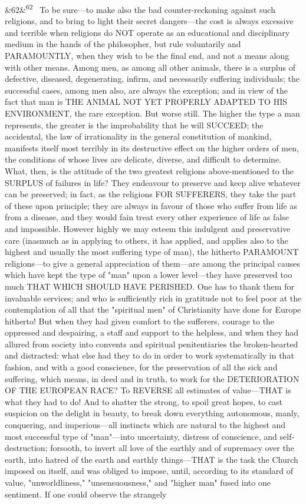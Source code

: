 \documentclass[12pt]{article}
\newcommand{\para}[1][]{\par\noindent\ifx&#1&\else\textsuperscript{\footnotesize #1}~\fi}
\begin{document}
\para[62] To be sure---to make also the bad counter-reckoning against such religions, and to bring to light their secret dangers---the cost is always excessive and terrible when religions do NOT operate as an educational and disciplinary medium in the hands of the philosopher, but rule voluntarily and PARAMOUNTLY, when they wish to be the final end, and not a means along with other means. Among men, as among all other animals, there is a surplus of defective, diseased, degenerating, infirm, and necessarily suffering individuals; the successful cases, among men also, are always the exception; and in view of the fact that man is THE ANIMAL NOT YET PROPERLY ADAPTED TO HIS ENVIRONMENT, the rare exception. But worse still. The higher the type a man represents, the greater is the improbability that he will SUCCEED; the accidental, the law of irrationality in the general constitution of mankind, manifests itself most terribly in its destructive effect on the higher orders of men, the conditions of whose lives are delicate, diverse, and difficult to determine. What, then, is the attitude of the two greatest religions above-mentioned to the SURPLUS of failures in life? They endeavour to preserve and keep alive whatever can be preserved; in fact, as the religions FOR SUFFERERS, they take the part of these upon principle; they are always in favour of those who suffer from life as from a disease, and they would fain treat every other experience of life as false and impossible. However highly we may esteem this indulgent and preservative care (inasmuch as in applying to others, it has applied, and applies also to the highest and usually the most suffering type of man), the hitherto PARAMOUNT religions---to give a general appreciation of them---are among the principal causes which have kept the type of "man" upon a lower level---they have preserved too much THAT WHICH SHOULD HAVE PERISHED. One has to thank them for invaluable services; and who is sufficiently rich in gratitude not to feel poor at the contemplation of all that the "spiritual men" of Christianity have done for Europe hitherto! But when they had given comfort to the sufferers, courage to the oppressed and despairing, a staff and support to the helpless, and when they had allured from society into convents and spiritual penitentiaries the broken-hearted and distracted: what else had they to do in order to work systematically in that fashion, and with a good conscience, for the preservation of all the sick and suffering, which means, in deed and in truth, to work for the DETERIORATION OF THE EUROPEAN RACE? To REVERSE all estimates of value---THAT is what they had to do! And to shatter the strong, to spoil great hopes, to cast suspicion on the delight in beauty, to break down everything autonomous, manly, conquering, and imperious---all instincts which are natural to the highest and most successful type of "man"---into uncertainty, distress of conscience, and self-destruction; forsooth, to invert all love of the earthly and of supremacy over the earth, into hatred of the earth and earthly things---THAT is the task the Church imposed on itself, and was obliged to impose, until, according to its standard of value, "unworldliness," "unsensuousness," and "higher man" fused into one sentiment. If one could observe the strangely 
\end{document}
